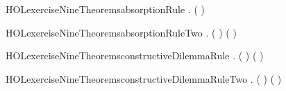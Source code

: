 \newcommand{\HOLexerciseNineDate}{13 October 2017}
\newcommand{\HOLexerciseNineTime}{22:27}
\begin{SaveVerbatim}{HOLexerciseNineTheoremsabsorptionRule}
\HOLTokenTurnstile{} \HOLSymConst{\HOLTokenForall{}} . ( \HOLSymConst{\HOLTokenImp{}} ) \HOLSymConst{\HOLTokenImp{}}  \HOLSymConst{\HOLTokenImp{}}  \HOLSymConst{\HOLTokenConj{}} 
\end{SaveVerbatim}
\newcommand{\HOLexerciseNineTheoremsabsorptionRule}{\UseVerbatim{HOLexerciseNineTheoremsabsorptionRule}}
\begin{SaveVerbatim}{HOLexerciseNineTheoremsabsorptionRuleTwo}
\HOLTokenTurnstile{} \HOLSymConst{\HOLTokenForall{}}   . ( \HOLSymConst{\HOLTokenImp{}} ) \HOLSymConst{\HOLTokenConj{}} ( \HOLSymConst{\HOLTokenImp{}} ) \HOLSymConst{\HOLTokenImp{}}  \HOLSymConst{\HOLTokenDisj{}}  \HOLSymConst{\HOLTokenImp{}}  \HOLSymConst{\HOLTokenDisj{}} 
\end{SaveVerbatim}
\newcommand{\HOLexerciseNineTheoremsabsorptionRuleTwo}{\UseVerbatim{HOLexerciseNineTheoremsabsorptionRuleTwo}}
\begin{SaveVerbatim}{HOLexerciseNineTheoremsconstructiveDilemmaRule}
\HOLTokenTurnstile{} \HOLSymConst{\HOLTokenForall{}}   . ( \HOLSymConst{\HOLTokenImp{}} ) \HOLSymConst{\HOLTokenConj{}} ( \HOLSymConst{\HOLTokenImp{}} ) \HOLSymConst{\HOLTokenImp{}}  \HOLSymConst{\HOLTokenDisj{}}  \HOLSymConst{\HOLTokenImp{}}  \HOLSymConst{\HOLTokenDisj{}} 
\end{SaveVerbatim}
\newcommand{\HOLexerciseNineTheoremsconstructiveDilemmaRule}{\UseVerbatim{HOLexerciseNineTheoremsconstructiveDilemmaRule}}
\begin{SaveVerbatim}{HOLexerciseNineTheoremsconstructiveDilemmaRuleTwo}
\HOLTokenTurnstile{} \HOLSymConst{\HOLTokenForall{}}   . ( \HOLSymConst{\HOLTokenImp{}} ) \HOLSymConst{\HOLTokenConj{}} ( \HOLSymConst{\HOLTokenImp{}} ) \HOLSymConst{\HOLTokenImp{}}  \HOLSymConst{\HOLTokenDisj{}}  \HOLSymConst{\HOLTokenImp{}}  \HOLSymConst{\HOLTokenDisj{}} 
\end{SaveVerbatim}
\newcommand{\HOLexerciseNineTheoremsconstructiveDilemmaRuleTwo}{\UseVerbatim{HOLexerciseNineTheoremsconstructiveDilemmaRuleTwo}}
\newcommand{\HOLexerciseNineTheorems}{
\HOLThmTag{exercise9}{absorptionRule}\HOLexerciseNineTheoremsabsorptionRule
\HOLThmTag{exercise9}{absorptionRule2}\HOLexerciseNineTheoremsabsorptionRuleTwo
\HOLThmTag{exercise9}{constructiveDilemmaRule}\HOLexerciseNineTheoremsconstructiveDilemmaRule
\HOLThmTag{exercise9}{constructiveDilemmaRule2}\HOLexerciseNineTheoremsconstructiveDilemmaRuleTwo
}
